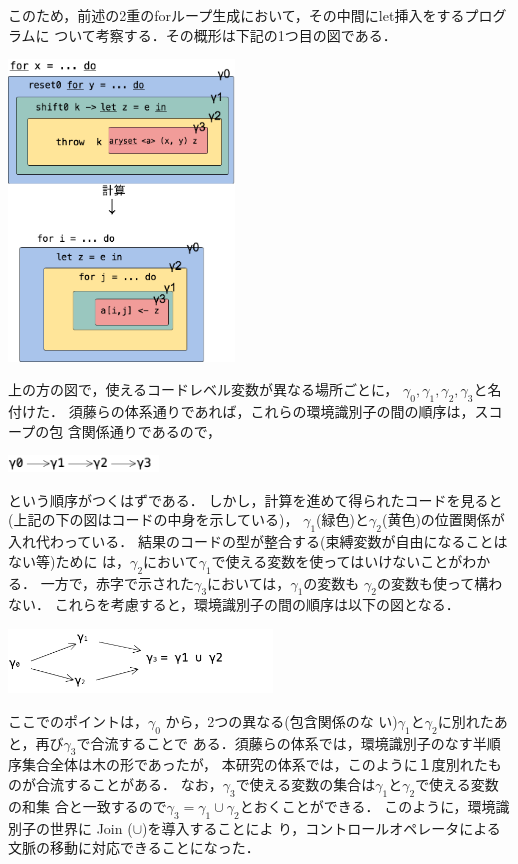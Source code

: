 このため，前述の2重のforループ生成において，その中間にlet挿入をするプログラムに
ついて考察する．その概形は下記の1つ目の図である．
\begin{center}
  \includegraphics[clip,height=8cm]{./img/ecex_for_non_gamma.png}
\end{center}
上の方の図で，使えるコードレベル変数が異なる場所ごとに，
$\gamma_0,\gamma_1,\gamma_2,\gamma_3$と名付けた．
須藤らの体系通りであれば，これらの環境識別子の間の順序は，スコープの包
含関係通りであるので，
\begin{center}
  \includegraphics[clip,width=4cm]{./img/gamma_normal.png}
\end{center}
という順序がつくはずである．
しかし，計算を進めて得られたコードを見ると(上記の下の図はコードの中身を示している)，
$\gamma_1$(緑色)と$\gamma_2$(黄色)の位置関係が入れ代わっている．
結果のコードの型が整合する(束縛変数が自由になることはない等)ために
は，$\gamma_2$において$\gamma_1$で使える変数を使ってはいけないことがわかる．
一方で，赤字で示された$\gamma_3$においては，$\gamma_1$の変数も
$\gamma_2$の変数も使って構わない．
これらを考慮すると，環境識別子の間の順序は以下の図となる．
\begin{center}
  \includegraphics[clip,width=7cm]{./img/gamma.png}
\end{center}
ここでのポイントは，$\gamma_0$ から，2つの異なる(包含関係のな
い)$\gamma_1$と$\gamma_2$に別れたあと，再び$\gamma_3$で合流することで
ある．須藤らの体系では，環境識別子のなす半順序集合全体は木の形であったが，
本研究の体系では，このように１度別れたものが合流することがある．
なお，$\gamma_3$で使える変数の集合は$\gamma_1$と$\gamma_2$で使える変数の和集
合と一致するので$\gamma_3 = \gamma_1 \cup \gamma_2$とおくことができる．
このように，環境識別子の世界に Join ($\cup$)を導入することによ
り，コントロールオペレータによる文脈の移動に対応できることになった．

